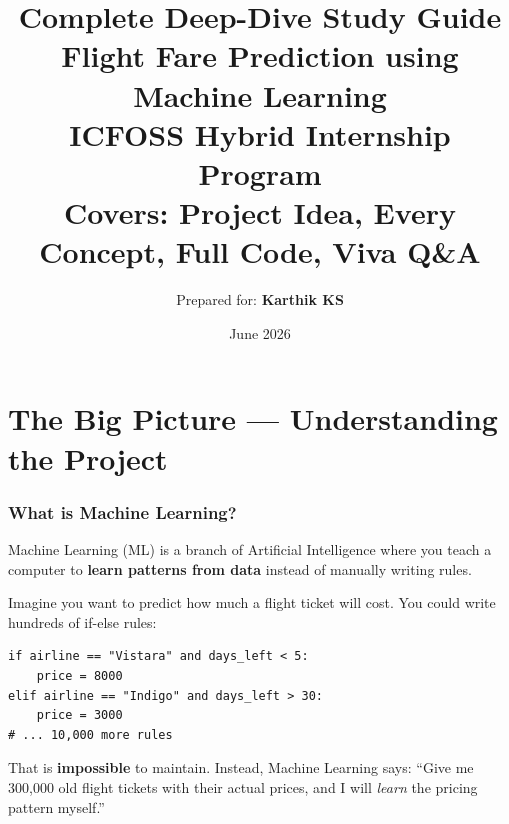 \documentclass[12pt, a4paper]{article}
\title{
    \textbf{\Huge Complete Deep-Dive Study Guide} \\[0.5cm]
    \textbf{\LARGE Flight Fare Prediction using Machine Learning} \\[0.5cm]
    \large ICFOSS Hybrid Internship Program \\[0.3cm]
    \large Covers: Project Idea, Every Concept, Full Code, Viva Q\&A
}
\author{Prepared for: \textbf{Karthik KS}}
\date{June 2026}
\begin{document}
\maketitle
\thispagestyle{empty}

\begin{center}
\end{center}

\newpage
\tableofcontents
\newpage



\part{The Big Picture — Understanding the Project}

\section{What is Machine Learning?}

\begin{conceptbox}
    Machine Learning (ML) is a branch of Artificial Intelligence where you teach a computer to \textbf{learn patterns from data} instead of manually writing rules.
\end{conceptbox}

Imagine you want to predict how much a flight ticket will cost. You could write hundreds of if-else rules:
\begin{lstlisting}
if airline == "Vistara" and days_left < 5:
    price = 8000
elif airline == "Indigo" and days_left > 30:
    price = 3000
# ... 10,000 more rules
\end{lstlisting}

That is \textbf{impossible} to maintain. Instead, Machine Learning says: ``Give me 300,000 old flight tickets with their actual prices, and I will \textit{learn} the pricing pattern myself.''
\end{document}
